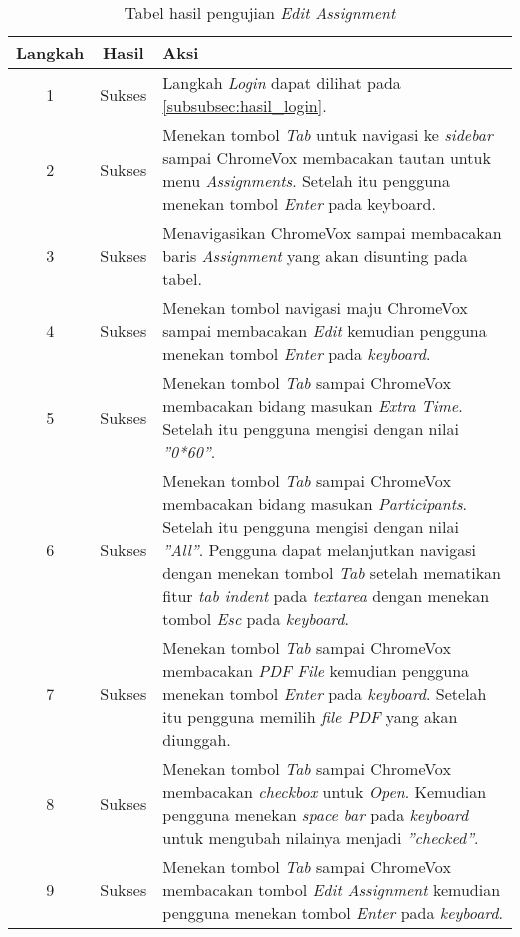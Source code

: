 \begin{table}[H]
	\centering
	\caption{Tabel hasil pengujian \textit{Edit Assignment}}
	\label{tab:hasil_edit_assignment}
	\begin{tabular}{|c|c|p{12cm}|}
		\toprule
		Langkah & Hasil & Aksi\\
		\midrule
		1 & Sukses & Langkah \textit{Login} dapat dilihat pada \ref{subsubsec:hasil_login}.\\
		2 & Sukses & Menekan tombol \textit{Tab} untuk navigasi ke \textit{sidebar} sampai ChromeVox membacakan tautan untuk menu \textit{Assignments}. Setelah itu pengguna menekan tombol \textit{Enter} pada keyboard.\\
		3 & Sukses & Menavigasikan ChromeVox sampai membacakan baris \textit{Assignment} yang akan disunting pada tabel.\\
		4 & Sukses & Menekan tombol navigasi maju ChromeVox sampai membacakan \textit{Edit} kemudian pengguna menekan tombol \textit{Enter} pada \textit{keyboard}.\\
		5 & Sukses & Menekan tombol \textit{Tab} sampai ChromeVox membacakan bidang masukan \textit{Extra Time}. Setelah itu pengguna mengisi dengan nilai \textit{''0*60''}.\\
		6 & Sukses & Menekan tombol \textit{Tab} sampai ChromeVox membacakan bidang masukan \textit{Participants}. Setelah itu pengguna mengisi dengan nilai \textit{''All''}. Pengguna dapat melanjutkan navigasi dengan menekan tombol \textit{Tab} setelah mematikan fitur \textit{tab indent} pada \textit{textarea} dengan menekan tombol \textit{Esc} pada \textit{keyboard}.\\
		7 & Sukses & Menekan tombol \textit{Tab} sampai ChromeVox membacakan \textit{PDF File} kemudian pengguna menekan tombol \textit{Enter} pada \textit{keyboard}. Setelah itu pengguna memilih \textit{file PDF} yang akan diunggah.\\
		8 & Sukses & Menekan tombol \textit{Tab} sampai ChromeVox membacakan \textit{checkbox} untuk \textit{Open}. Kemudian pengguna menekan \textit{space bar} pada \textit{keyboard} untuk mengubah nilainya menjadi \textit{''checked''}.\\
		9 & Sukses & Menekan tombol \textit{Tab} sampai ChromeVox membacakan tombol \textit{Edit Assignment} kemudian pengguna menekan tombol \textit{Enter} pada \textit{keyboard}.\\
		\bottomrule
	\end{tabular}
\end{table}

